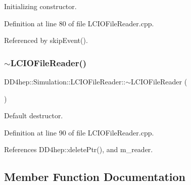 Initializing constructor. 



Definition at line 80 of file L\+C\+I\+O\+File\+Reader.\+cpp.



Referenced by skip\+Event().

\hypertarget{class_d_d4hep_1_1_simulation_1_1_l_c_i_o_file_reader_aa8bf3dbda65e5c2443027f2dd94390e4}{}\label{class_d_d4hep_1_1_simulation_1_1_l_c_i_o_file_reader_aa8bf3dbda65e5c2443027f2dd94390e4} 
\subsubsection{\texorpdfstring{$\sim$\+L\+C\+I\+O\+File\+Reader()}{~LCIOFileReader()}}
{\footnotesize\ttfamily D\+D4hep\+::\+Simulation\+::\+L\+C\+I\+O\+File\+Reader\+::$\sim$\+L\+C\+I\+O\+File\+Reader (\begin{DoxyParamCaption}{ }\end{DoxyParamCaption})\hspace{0.3cm}{\ttfamily [virtual]}}



Default destructor. 



Definition at line 90 of file L\+C\+I\+O\+File\+Reader.\+cpp.



References D\+D4hep\+::delete\+Ptr(), and m\+\_\+reader.



\subsection{Member Function Documentation}
\hypertarget{class_d_d4hep_1_1_simulation_1_1_l_c_i_o_file_reader_ad4648d75cd88d24476ff41e493b5c0ed}{}\label{class_d_d4hep_1_1_simulation_1_1_l_c_i_o_file_reader_ad4648d75cd88d24476ff41e493b5c0ed} 
